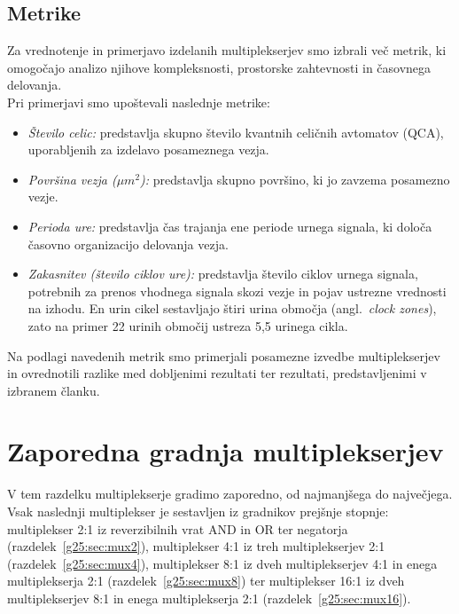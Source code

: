 \documentclass[graybox, envcountchap]{svmult}
\begin{document}
\subsection{Metrike}
\label{g25:sec:metrike}

Za vrednotenje in primerjavo izdelanih multiplekserjev smo izbrali več metrik, ki omogočajo analizo njihove kompleksnosti, prostorske zahtevnosti in časovnega delovanja.\\


Pri primerjavi smo upoštevali naslednje metrike:

\begin{itemize}
    \item \textit{Število celic:} predstavlja skupno število kvantnih celičnih avtomatov (QCA), uporabljenih za izdelavo posameznega vezja.

    \item \textit{Površina vezja ($\mu m^2$):} predstavlja skupno površino, ki jo zavzema posamezno vezje.

    \item \textit{Perioda ure:} predstavlja čas trajanja ene periode urnega signala, ki določa časovno organizacijo delovanja vezja.

    \item \textit{Zakasnitev (število ciklov ure):} predstavlja število ciklov urnega signala, potrebnih za prenos vhodnega signala skozi vezje in pojav ustrezne vrednosti na izhodu. En urin cikel sestavljajo štiri urina območja (angl.~\emph{clock zones}), zato na primer 22 urinih območij ustreza 5,5 urinega cikla.

\end{itemize}

Na podlagi navedenih metrik smo primerjali posamezne izvedbe multiplekserjev in ovrednotili razlike med dobljenimi rezultati ter rezultati, predstavljenimi v izbranem članku.

\section{Zaporedna gradnja multiplekserjev}
\label{g25:sec:gradnja}
V tem razdelku multiplekserje gradimo zaporedno, od najmanjšega do največjega. Vsak naslednji multiplekser je sestavljen iz gradnikov prejšnje stopnje: multiplekser 2:1 iz reverzibilnih vrat AND in OR ter negatorja (razdelek~\ref{g25:sec:mux2}), multiplekser 4:1 iz treh multiplekserjev 2:1 (razdelek~\ref{g25:sec:mux4}), multiplekser 8:1 iz dveh multiplekserjev 4:1 in enega multiplekserja 2:1 (razdelek~\ref{g25:sec:mux8}) ter multiplekser 16:1 iz dveh multiplekserjev 8:1 in enega multiplekserja 2:1 (razdelek~\ref{g25:sec:mux16}).
\end{document}
